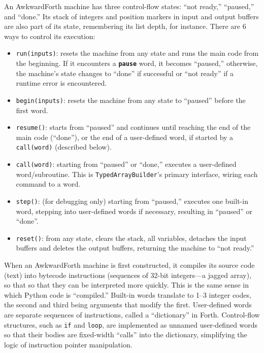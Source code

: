 \documentclass{webofc}
\begin{document}
An AwkwardForth machine has three control-flow states: ``not ready,'' ``paused,'' and ``done.'' Its stack of integers and position markers in input and output buffers are also part of its state, remembering its list depth, for instance. There are 6 ways to control its execution:
\begin{itemize}
\item \texttt{run(inputs)}: resets the machine from any state and runs the main code from the beginning. If it encounters a \textcolor{OliveGreen}{\tt\textbf{pause}} word, it becomes ``paused,'' otherwise, the machine's state changes to ``done'' if successful or ``not ready'' if a runtime error is encountered.
\item \texttt{begin(inputs)}: resets the machine from any state to ``paused'' before the first word.
\item \texttt{resume()}: starts from ``paused'' and continues until reaching the end of the main code (``done''), or the end of a user-defined word, if started by a \texttt{call(word)} (described below).
\item \texttt{call(word)}: starting from ``paused'' or ``done,'' executes a user-defined word/subroutine. This is \texttt{TypedArrayBuilder}'s primary interface, wiring each command to a word.
\item \texttt{step()}: (for debugging only) starting from ``paused,'' executes one built-in word, stepping into user-defined words if necessary, resulting in ``paused'' or ``done''.
\item \texttt{reset()}: from any state, clears the stack, all variables, detaches the input buffers and deletes the output buffers, returning the machine to ``not ready.''
\end{itemize}

When an AwkwardForth machine is first constructed, it compiles its source code (text) into bytecode instructions (sequences of 32-bit integers---a jagged array), so that so that they can be interpreted more quickly. This is the same sense in which Python code is ``compiled.'' Built-in words translate to 1--3 integer codes, the second and third being arguments that modify the first. User-defined words are separate sequences of instructions, called a ``dictionary'' in Forth. Control-flow structures, such as \texttt{if} and \texttt{loop}, are implemented as unnamed user-defined words so that their bodies are fixed-width ``calls'' into the dictionary, simplifying the logic of instruction pointer manipulation.
\end{document}

